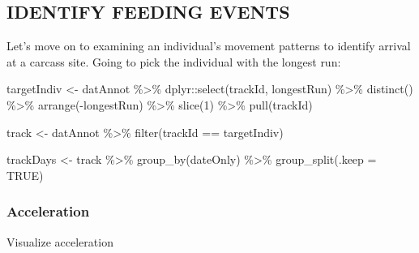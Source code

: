 \documentclass[
]{article}
\newenvironment{Shaded}{\begin{snugshade}}{\end{snugshade}}
\newcommand{\AttributeTok}[1]{\textcolor[rgb]{0.77,0.63,0.00}{#1}}
\newcommand{\ConstantTok}[1]{\textcolor[rgb]{0.00,0.00,0.00}{#1}}
\newcommand{\DecValTok}[1]{\textcolor[rgb]{0.00,0.00,0.81}{#1}}
\newcommand{\FunctionTok}[1]{\textcolor[rgb]{0.00,0.00,0.00}{#1}}
\newcommand{\NormalTok}[1]{#1}
\newcommand{\OtherTok}[1]{\textcolor[rgb]{0.56,0.35,0.01}{#1}}
\newcommand{\SpecialCharTok}[1]{\textcolor[rgb]{0.00,0.00,0.00}{#1}}
\begin{document}
\hypertarget{identify-feeding-events}{%
\subsection{IDENTIFY FEEDING EVENTS}\label{identify-feeding-events}}

Let's move on to examining an individual's movement patterns to identify
arrival at a carcass site. Going to pick the individual with the longest
run:

\begin{Shaded}
\begin{Highlighting}[]
\NormalTok{targetIndiv }\OtherTok{\textless{}{-}}\NormalTok{ datAnnot }\SpecialCharTok{\%\textgreater{}\%}
\NormalTok{  dplyr}\SpecialCharTok{::}\FunctionTok{select}\NormalTok{(trackId, longestRun) }\SpecialCharTok{\%\textgreater{}\%}
  \FunctionTok{distinct}\NormalTok{() }\SpecialCharTok{\%\textgreater{}\%}
  \FunctionTok{arrange}\NormalTok{(}\SpecialCharTok{{-}}\NormalTok{longestRun) }\SpecialCharTok{\%\textgreater{}\%}
  \FunctionTok{slice}\NormalTok{(}\DecValTok{1}\NormalTok{) }\SpecialCharTok{\%\textgreater{}\%}
  \FunctionTok{pull}\NormalTok{(trackId)}

\NormalTok{track }\OtherTok{\textless{}{-}}\NormalTok{ datAnnot }\SpecialCharTok{\%\textgreater{}\%}
  \FunctionTok{filter}\NormalTok{(trackId }\SpecialCharTok{==}\NormalTok{ targetIndiv)}

\NormalTok{trackDays }\OtherTok{\textless{}{-}}\NormalTok{ track }\SpecialCharTok{\%\textgreater{}\%}
  \FunctionTok{group\_by}\NormalTok{(dateOnly) }\SpecialCharTok{\%\textgreater{}\%}
  \FunctionTok{group\_split}\NormalTok{(}\AttributeTok{.keep =} \ConstantTok{TRUE}\NormalTok{)}
\end{Highlighting}
\end{Shaded}

\hypertarget{acceleration}{%
\subsubsection{Acceleration}\label{acceleration}}

Visualize acceleration
\end{document}
